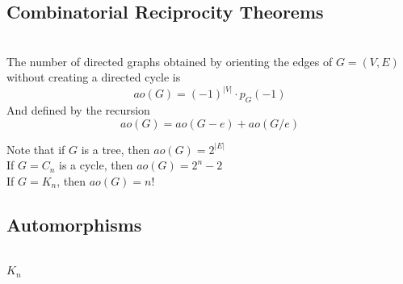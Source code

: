 \documentclass[12pt]{article}
\begin{document}
	
	\subsection{Combinatorial Reciprocity Theorems}
	\begin{center} \end{center}
	
	\begin{tcolorbox}
	\\
	The number of directed graphs obtained by orienting the edges of $G =(V,E)$ \\
	without creating a directed cycle is
	$$ao(G) = (-1)^{|V|} \cdot p_G(-1)$$
	And defined by the recursion
	$$ao(G) = ao(G-e) + ao(G/e)$$
	
	Note that if $G$ is a tree, then $ao(G) = 2^{|E|}$ \\
	 If $G = C_n$ is a cycle, then $ao(G) = 2^{n} -2$ \\
	 If $G = K_n$, then $ao(G) = n!$ \\
	\end{tcolorbox}
	
	\subsection{Automorphisms}
	\begin{center} \end{center}
	
	\begin{tcolorbox}
	\\
	$K_n$ 
	\end{tcolorbox}

	
	
\end{document}
